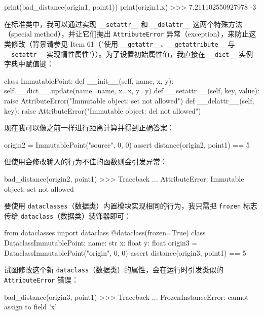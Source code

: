 \begin{codebox}[python]
print(bad_distance(origin1, point1))
print(origin1.x)
>>>
7.211102550927978
-3
\end{codebox}

在标准类中，我可以通过实现 \texttt{\_\_setattr\_\_} 和 \texttt{\_\_delattr\_\_} 这两个特殊方法（special method），并让它们抛出 \texttt{AttributeError} 异常（exception），来防止这类修改（背景请参见 Item 61（"使用 \texttt{\_\_getattr\_\_}、\texttt{\_\_getattribute\_\_} 与 \texttt{\_\_setattr\_\_} 实现惰性属性"））。为了设置初始属性值，我直接在 \texttt{\_\_dict\_\_} 实例字典中赋值键：

\begin{codebox}[python]
class ImmutablePoint:
    def __init__(self, name, x, y):
        self.__dict__.update(name=name, x=x, y=y)
    def __setattr__(self, key, value):
        raise AttributeError("Immutable object: set not allowed")
    def __delattr__(self, key):
        raise AttributeError("Immutable object: del not allowed")
\end{codebox}

现在我可以像之前一样进行距离计算并得到正确答案：

\begin{codebox}[python]
origin2 = ImmutablePoint("source", 0, 0)
assert distance(origin2, point1) == 5
\end{codebox}

但使用会修改输入的行为不佳的函数则会引发异常：

\begin{codebox}[python]
bad_distance(origin2, point1)
>>>
Traceback ...
AttributeError: Immutable object: set not allowed
\end{codebox}

要使用 \texttt{dataclasses}（数据类）内置模块实现相同的行为，我只需把 \texttt{frozen} 标志传给 \texttt{dataclass}（数据类）装饰器即可：

\begin{codebox}[python]
from dataclasses import dataclass
@dataclass(frozen=True)
class DataclassImmutablePoint:
    name: str
    x: float
    y: float
origin3 = DataclassImmutablePoint("origin", 0, 0)
assert distance(origin3, point1) == 5
\end{codebox}

试图修改这个新 \texttt{dataclass}（数据类）的属性，会在运行时引发类似的 \texttt{AttributeError} 错误：

\begin{codebox}[python]
bad_distance(origin3, point1)
>>>
Traceback ...
FrozenInstanceError: cannot assign to field 'x'
\end{codebox}

